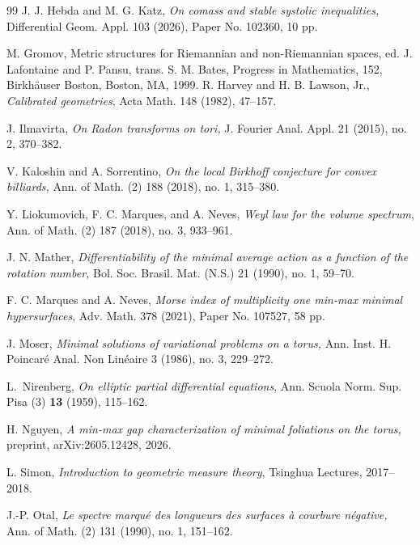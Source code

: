 \documentclass[11pt]{amsart}
\theoremstyle{remark}
\theoremstyle{definition}
\begin{document}
\begin{thebibliography}{99}
		 J. J. Hebda and M. G. Katz, {\em On comass and stable systolic inequalities,} Differential Geom. Appl. 103 (2026), Paper No. 102360, 10 pp.
		
		M. Gromov, Metric structures for Riemannian and non-Riemannian spaces, ed. J. Lafontaine and P. Pansu, trans. S. M. Bates, Progress in Mathematics, 152, Birkh\"auser Boston, Boston, MA, 1999.
		R. Harvey and H. B. Lawson, Jr.,
		\emph{Calibrated geometries},
		Acta Math. 148 (1982), 47--157.
		
		 J. Ilmavirta, {\em On Radon transforms on tori,} J. Fourier Anal. Appl. 21 (2015), no. 2, 370--382.
		
		 V. Kaloshin and A. Sorrentino, {\em On the local Birkhoff conjecture for convex billiards,} Ann. of Math. (2) 188 (2018), no. 1, 315--380.
		
		
		
		
		Y. Liokumovich, F. C. Marques, and A. Neves,
		\emph{Weyl law for the volume spectrum},
		Ann. of Math. (2) 187 (2018), no. 3, 933--961.
		
		 J. N. Mather, {\em Differentiability of the minimal average action as a function of the rotation number,} Bol. Soc. Brasil. Mat. (N.S.) 21 (1990), no. 1, 59--70.
		
		F. C. Marques and A. Neves,
		\emph{Morse index of multiplicity one min-max minimal hypersurfaces},
		Adv. Math. 378 (2021), Paper No. 107527, 58 pp.
		
		 J. Moser, {\em Minimal solutions of variational problems on a torus,} Ann. Inst. H. Poincar\'e Anal. Non Lin\'eaire 3 (1986), no. 3, 229--272.
		
		L.~Nirenberg,
		\emph{On elliptic partial differential equations},
		Ann. Scuola Norm. Sup. Pisa (3) \textbf{13} (1959),
		115--162.
		
		 H. Nguyen, {\em A min-max gap characterization of minimal foliations on the torus,} preprint, arXiv:2605.12428, 2026.
		
		
		
		
		L. Simon,
		\emph{Introduction to geometric measure theory},
		Tsinghua Lectures, 2017--2018.
		
		 J.-P. Otal, \emph{Le spectre marqu\'e{} des longueurs des surfaces \`a{} courbure n\'egative,} Ann. of Math. (2) 131 (1990), no. 1, 151--162.
		

\end{thebibliography}
\end{document}
